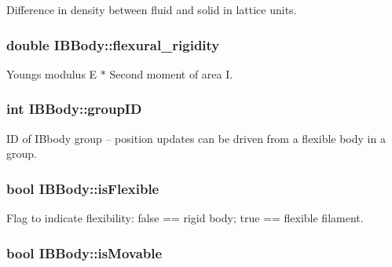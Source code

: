 Difference in density between fluid and solid in lattice units. 

\subsubsection[{\texorpdfstring{flexural\+\_\+rigidity}{flexural_rigidity}}]{\setlength{\rightskip}{0pt plus 5cm}double I\+B\+Body\+::flexural\+\_\+rigidity\hspace{0.3cm}{\ttfamily [protected]}}\hypertarget{class_i_b_body_a4825a8ef9155062ff9d1011479bd4a9e}{}\label{class_i_b_body_a4825a8ef9155062ff9d1011479bd4a9e}


Young\textquotesingle{}s modulus E $\ast$ Second moment of area I. 

\subsubsection[{\texorpdfstring{group\+ID}{groupID}}]{\setlength{\rightskip}{0pt plus 5cm}int I\+B\+Body\+::group\+ID\hspace{0.3cm}{\ttfamily [protected]}}\hypertarget{class_i_b_body_a4674ade74a2b55ce60a656acfebb4a55}{}\label{class_i_b_body_a4674ade74a2b55ce60a656acfebb4a55}


ID of I\+Bbody group -- position updates can be driven from a flexible body in a group. 

\subsubsection[{\texorpdfstring{is\+Flexible}{isFlexible}}]{\setlength{\rightskip}{0pt plus 5cm}bool I\+B\+Body\+::is\+Flexible\hspace{0.3cm}{\ttfamily [protected]}}\hypertarget{class_i_b_body_a58de7cc12e734b646904e81a56b18b4e}{}\label{class_i_b_body_a58de7cc12e734b646904e81a56b18b4e}


Flag to indicate flexibility\+: false == rigid body; true == flexible filament. 

\subsubsection[{\texorpdfstring{is\+Movable}{isMovable}}]{\setlength{\rightskip}{0pt plus 5cm}bool I\+B\+Body\+::is\+Movable\hspace{0.3cm}{\ttfamily [protected]}}\hypertarget{class_i_b_body_a9f0773d31ac48e0f5b3174e6040732f9}{}\label{class_i_b_body_a9f0773d31ac48e0f5b3174e6040732f9}


